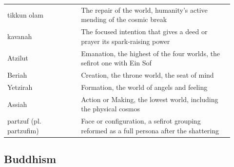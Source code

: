 \begin{longtable}{L{0.30\linewidth} L{0.62\linewidth}}
tikkun olam & The repair of the world, humanity's active mending of the cosmic break \\
kavanah & The focused intention that gives a deed or prayer its spark-raising power \\
Atzilut & Emanation, the highest of the four worlds, the sefirot one with Ein Sof \\
Beriah & Creation, the throne world, the seat of mind \\
Yetzirah & Formation, the world of angels and feeling \\
Assiah & Action or Making, the lowest world, including the physical cosmos \\
partzuf (pl. partzufim) & Face or configuration, a sefirot grouping reformed as a full persona after the shattering \\
\bottomrule
\end{longtable}

\subsection{Buddhism}

